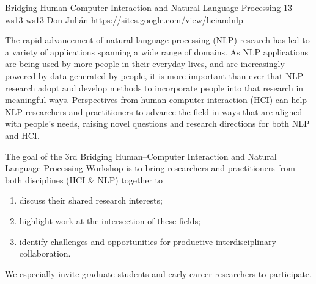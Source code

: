 \begin{wsschedulenolist}
{Bridging Human-Computer Interaction and Natural Language Processing}
{13}
{ws13}
{ws13}
{Don Juli\'an}
{https://sites.google.com/view/hciandnlp}

The rapid advancement of natural language processing (NLP) research has led to a variety of applications spanning a wide range of domains. As NLP applications are being used by more people in their everyday lives, and are increasingly powered by data generated by people, it is more important than ever that NLP research adopt and develop methods to incorporate people into that research in meaningful ways. Perspectives from human-computer interaction (HCI) can help NLP researchers and practitioners to advance the field in ways that are aligned with people's needs, raising novel questions and research directions for both NLP and HCI.

The goal of the 3rd Bridging Human--Computer Interaction and Natural Language Processing Workshop is to bring researchers and practitioners from both disciplines (HCI & NLP) together to

\begin{enumerate}
    \item discuss their shared research interests;
    \item highlight work at the intersection of these fields;
    \item identify challenges and opportunities for productive interdisciplinary collaboration.
\end{enumerate}

We especially invite graduate students and early career researchers to participate.

\end{wsschedulenolist}
